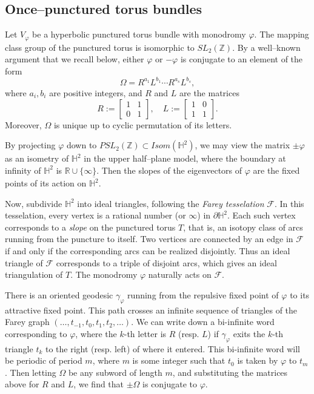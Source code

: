 \documentclass[11pt]{amsart}
\newcommand{\HH}{{\mathbb{H}}}
\newcommand{\RR}{{\mathbb{R}}}
\newcommand{\ZZ}{{\mathbb{Z}}}
\newcommand{\bdy}{{\partial}}
\newcommand{\farey}{{\mathcal{F}}}
\theoremstyle{plain}
\theoremstyle{definition}
\begin{document}
\subsection{Once--punctured torus bundles}\label{sec:ptorus}

Let $V_\varphi$ be a hyperbolic punctured torus bundle with monodromy
$\varphi$.  The mapping class group of the punctured torus is
isomorphic to $SL_2(\ZZ)$.  By a well--known argument that we recall
below, either $\varphi$ or $-\varphi$ is conjugate to an element of
the form
$$\Omega = R^{a_1}L^{b_1}\cdots R^{a_s}L^{b_s},$$
%
where $a_i, b_i$ are positive integers, and $R$ and $L$ are the
matrices
$$R := \begin{bmatrix} 1& 1 \\ 0&1\end{bmatrix}, \quad
	L := \begin{bmatrix} 1& 0 \\ 1& 1 \end{bmatrix}.$$
%
Moreover, $\Omega$ is unique up to cyclic permutation of its letters.

By projecting $\varphi$ down to $PSL_2(\ZZ) \subset Isom(\HH^2) $, we
may view the matrix $\pm \varphi$ as an isometry of $\HH^2$ in the
upper half--plane model, where the boundary at infinity of $\HH^2$ is
$\RR \cup \{ \infty \}$.  Then the slopes of the eigenvectors of
$\varphi$ are the fixed points of its action on $\overline{\HH^2}$.

Now, subdivide $\HH^2$ into ideal triangles, following the \emph{Farey
tesselation} $\farey$.  In this tesselation, every vertex is a
rational number (or $\infty$) in $\bdy \HH^2$.  Each such vertex
corresponds to a \emph{slope} on the punctured torus $T$, that is, an
isotopy class of arcs running from the puncture to itself.  Two
vertices are connected by an edge in $\farey$ if and only if the
corresponding arcs can be realized disjointly.  Thus an ideal triangle
of $\farey$ corresponds to a triple of disjoint arcs, which gives an
ideal triangulation of $T$.  The monodromy $\varphi$ naturally acts on
$\farey$.

There is an oriented geodesic $\gamma_\varphi$ running from the
repulsive fixed point of $\varphi$ to its attractive fixed point.
This path crosses an infinite sequence of triangles of the Farey graph
$(\dots, t_{-1}, t_0, t_1, t_2, \dots)$.  We can write down a
bi-infinite word corresponding to $\varphi$, where the $k$-th letter
is $R$ (resp. $L$) if $\gamma_\varphi$ exits the $k$-th triangle $t_k$
to the right (resp. left) of where it entered.  This bi-infinite word
will be periodic of period $m$, where $m$ is some integer such that
$t_0$ is taken by $\varphi$ to $t_m$.  Then letting $\Omega$ be any
subword of length $m$, and substituting the matrices above for $R$ and
$L$, we find that $\pm \Omega$ is conjugate to $\varphi$.
\end{document}
